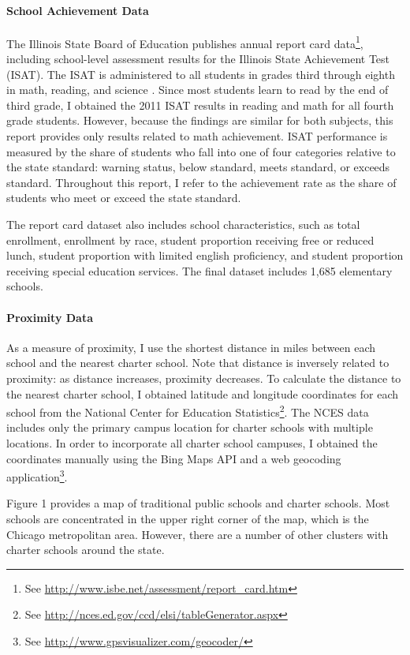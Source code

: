 \documentclass[11pt]{article}
\begin{document}
\paragraph{School Achievement Data} The Illinois State Board of Education publishes annual report card data\footnote{See \url{http://www.isbe.net/assessment/report_card.htm}}, including school-level assessment results for the Illinois State Achievement Test (ISAT).  The ISAT is administered to all students in grades third through eighth in math, reading, and science \citep{illinois_state_board_of_education_isbe_2009-2010_2012}.  Since most students learn to read by the end of third grade, I obtained the 2011 ISAT results in reading and math for all fourth grade students.  However, because the findings are similar for both subjects, this report provides only results related to math achievement.  ISAT performance is measured by the share of students who fall into one of four categories relative to the state standard: warning status, below standard, meets standard, or exceeds standard.  Throughout this report, I refer to the achievement rate as the share of students who meet or exceed the state standard.

The report card dataset also includes school characteristics, such as total enrollment, enrollment by race, student proportion receiving free or reduced lunch, student proportion with limited english proficiency, and student proportion receiving special education services.  The final dataset includes 1,685 elementary schools.

\paragraph{Proximity Data} As a measure of proximity, I use the shortest distance in miles between each school and the nearest charter school.  Note that distance is inversely related to proximity: as distance increases, proximity decreases.  To calculate the distance to the nearest charter school, I obtained latitude and longitude coordinates for each school from the National Center for Education Statistics\footnote{See \url{http://nces.ed.gov/ccd/elsi/tableGenerator.aspx}}.  The NCES data includes only the primary campus location for charter schools with multiple locations.  In order to incorporate all charter school campuses, I obtained the coordinates manually using the Bing Maps API and a web geocoding application\footnote{See \url{http://www.gpsvisualizer.com/geocoder/}}.

Figure 1 provides a map of traditional public schools and charter schools.  Most schools are concentrated in the upper right corner of the map, which is the Chicago metropolitan area.  However, there are a number of other clusters with charter schools around the state.
\end{document}
